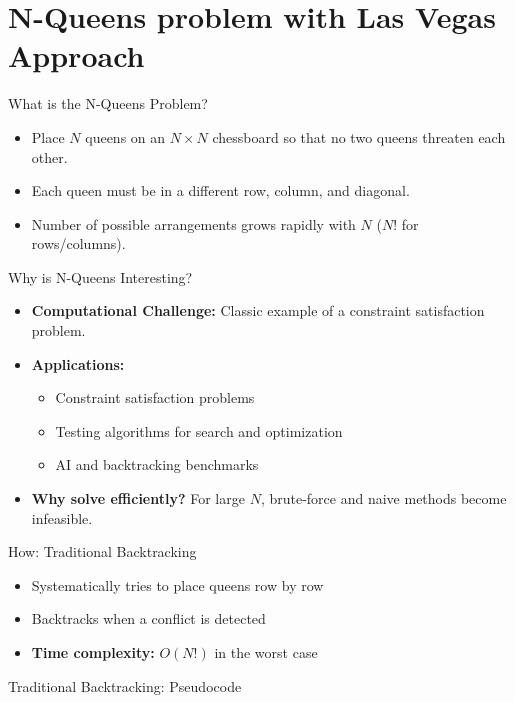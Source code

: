 \section{N-Queens problem with Las Vegas Approach}
\begin{frame}{What is the N-Queens Problem?}
  \begin{itemize}
    \item Place $N$ queens on an $N \times N$ chessboard so that no two queens threaten each other.
    \item Each queen must be in a different row, column, and diagonal.
    \item Number of possible arrangements grows rapidly with $N$ ($N!$ for rows/columns).
  \end{itemize}
\end{frame}

\begin{frame}{Why is N-Queens Interesting?}
  \begin{itemize}
    \item \textbf{Computational Challenge:} Classic example of a constraint satisfaction problem.
    \item \textbf{Applications:}
          \begin{itemize}
            \item Constraint satisfaction problems
            \item Testing algorithms for search and optimization
            \item AI and backtracking benchmarks
          \end{itemize}
    \item \textbf{Why solve efficiently?} For large $N$, brute-force and naive methods become infeasible.
  \end{itemize}
\end{frame}

\begin{frame}[fragile]{How: Traditional Backtracking}
  \begin{itemize}
    \item Systematically tries to place queens row by row
    \item Backtracks when a conflict is detected
    \item \textbf{Time complexity:} $O(N!)$ in the worst case
  \end{itemize}
\end{frame}

\begin{frame}[fragile]{Traditional Backtracking: Pseudocode}
  \scriptsize
  \begin{algorithm}[H]
  \end{algorithm}
\end{frame}

